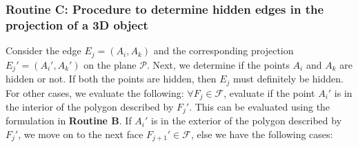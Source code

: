 \documentclass[12pt]{report}
\begin{document}
\subsubsection*{Routine C: Procedure to determine hidden edges in the projection of a 3D object}
Consider the edge \(E_{j} = (A_{i},A_{k}) \) and the corresponding projection \(E_{j}' = (A_{i}',A_{k}') \) on the plane \(\mathcal{P} \). Next, we determine if the points \(A_{i}\) and \(A_{k}\) are hidden or not. If both the points are hidden, then \(E_{j}\) must definitely be hidden. \\
For other cases, we evaluate the following: \(\forall F_{j} \in \mathcal{F}\), evaluate if the point \(A_{i}'\) is in the interior of the polygon described by \(F_{j}'\). This can be evaluated using the formulation in \textbf{Routine B}. If \(A_{i}'\) is in the exterior of the polygon described by \(F_{j}'\), we move on to the next face \(F_{j+1}' \in \mathcal{F}\), else we have the following cases: 
\end{document}
